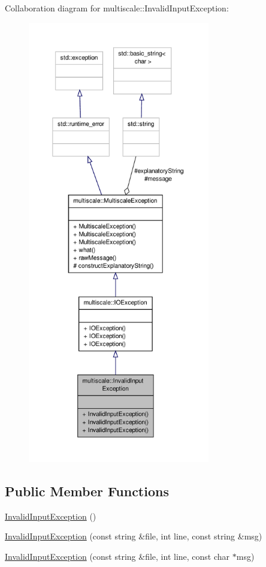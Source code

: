 Collaboration diagram for multiscale\-:\-:Invalid\-Input\-Exception\-:\nopagebreak
\begin{figure}[H]
\begin{center}
\leavevmode
\includegraphics[height=550pt]{classmultiscale_1_1InvalidInputException__coll__graph}
\end{center}
\end{figure}
\subsection*{Public Member Functions}
\begin{DoxyCompactItemize}
\item 
\hyperlink{classmultiscale_1_1InvalidInputException_a97da43e8ff0bc8687952219cff9b9796}{Invalid\-Input\-Exception} ()
\item 
\hyperlink{classmultiscale_1_1InvalidInputException_aea7260856bd45bd4443d7626de243b72}{Invalid\-Input\-Exception} (const string \&file, int line, const string \&msg)
\item 
\hyperlink{classmultiscale_1_1InvalidInputException_af12fa935cdc2aacbba5ea8cda0ef8df1}{Invalid\-Input\-Exception} (const string \&file, int line, const char $\ast$msg)
\end{DoxyCompactItemize}
